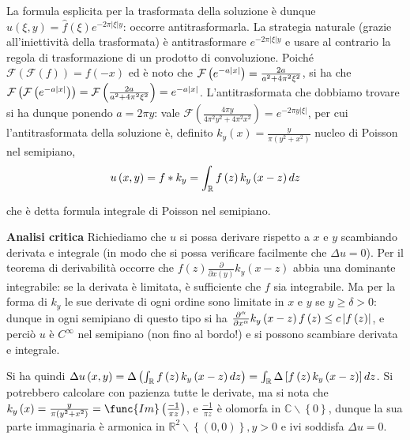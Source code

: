 \documentclass{article}
\begin{document}
La formula esplicita per la trasformata della soluzione \`{e} dunque $\hat{u}%
\left( \xi ,y\right) =\hat{f}\left( \xi \right) e^{-2\pi \left\vert \xi
\right\vert y}$: occorre antitrasformarla. La strategia naturale (grazie
all'iniettivit\`{a} della trasformata) \`{e} antitrasformare $e^{-2\pi
\left\vert \xi \right\vert y}$ e usare al contrario la regola di
trasformazione di un prodotto di convoluzione. Poich\'{e} $\mathcal{F}\left( 
\mathcal{F}\left( f\right) \right) =f\left( -x\right) $ ed \`{e} noto che $%
\mathcal{F}\left( e^{-a\left\vert x\right\vert }\right) =\frac{2a}{%
a^{2}+4\pi ^{2}\xi ^{2}}$, si ha che $\mathcal{F}\left( \mathcal{F}\left(
e^{-a\left\vert x\right\vert }\right) \right) =\mathcal{F}\left( \frac{2a}{%
a^{2}+4\pi ^{2}\xi ^{2}}\right) =e^{-a\left\vert x\right\vert }$.
L'antitrasformata che dobbiamo trovare si ha dunque ponendo $a=2\pi y$: vale 
$\mathcal{F}\left( \frac{4\pi y}{4\pi ^{2}y^{2}+4\pi ^{2}x^{2}}\right)
=e^{-2\pi y\left\vert \xi \right\vert }$, per cui l'antitrasformata della
soluzione \`{e}, definito $k_{y}\left( x\right) =\frac{y}{\pi \left(
y^{2}+x^{2}\right) }$ nucleo di Poisson nel semipiano,%
\begin{equation*}
u\left( x,y\right) =f\ast k_{y}=\int_{%
\mathbb{R}
}f\left( z\right) k_{y}\left( x-z\right) dz
\end{equation*}

che \`{e} detta formula integrale di Poisson nel semipiano.

\textbf{Analisi critica} Richiediamo che $u$ si possa derivare rispetto a $x$
e $y$ scambiando derivata e integrale (in modo che si possa verificare
facilmente che $\Delta u=0$). Per il teorema di derivabilit\`{a} occorre che 
$f\left( z\right) \frac{\partial }{\partial x\left( y\right) }k_{y}\left(
x-z\right) $ abbia una dominante integrabile: se la derivata \`{e} limitata, 
\`{e} sufficiente che $f$ sia integrabile. Ma per la forma di $k_{y}$ le sue
derivate di ogni ordine sono limitate in $x$ e $y$ se $y\geq \delta >0$:
dunque in ogni semipiano di questo tipo si ha $\frac{\partial ^{\alpha }}{%
\partial x^{\alpha }}k_{y}\left( x-z\right) f\left( z\right) \leq
c\left\vert f\left( z\right) \right\vert $, e perci\`{o} $u$ \`{e} $%
C^{\infty }$ nel semipiano (non fino al bordo!) e si possono scambiare
derivata e integrale.

Si ha quindi $\Delta u\left( x,y\right) =\Delta \left( \int_{%
\mathbb{R}
}f\left( z\right) k_{y}\left( x-z\right) dz\right) =\int_{%
\mathbb{R}
}\Delta \left[ f\left( z\right) k_{y}\left( x-z\right) \right] dz$. Si
potrebbero calcolare con pazienza tutte le derivate, ma si nota che $%
k_{y}\left( x\right) =\frac{y}{\pi \left( y^{2}+x^{2}\right) }=\func{Im}%
\left( \frac{-1}{\pi z}\right) $, e $\frac{-1}{\pi z}$ \`{e} olomorfa in $%
\mathbb{C}
\backslash \left\{ 0\right\} $, dunque la sua parte immaginaria \`{e}
armonica in $%
\mathbb{R}
^{2}\backslash \left\{ \left( 0,0\right) \right\} ,y>0$ e ivi soddisfa $%
\Delta u=0$.
\end{document}
